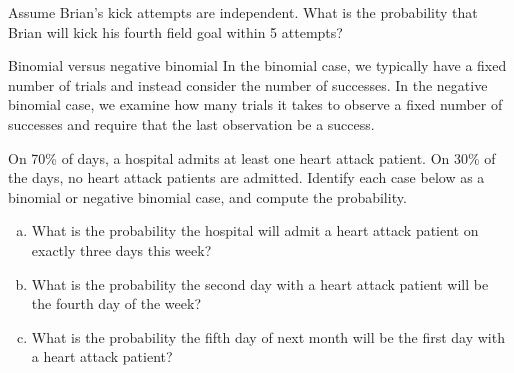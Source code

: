 \begin{exercisewrap}
\begin{nexercise}
Assume Brian's kick attempts are independent. What is the probability that Brian will kick his fourth field goal within 5 attempts?\footnotemark
\end{nexercise}
\end{exercisewrap}

\begin{onebox}{Binomial versus negative binomial}
  In the binomial case, we typically have a fixed number
  of trials and instead consider the number of successes.
  In the negative binomial case, we examine how many trials
  it takes to observe a fixed number of successes and
  require that the last observation be a success.
\end{onebox}

\begin{exercisewrap}
\begin{nexercise}
On 70\% of days, a hospital admits at least one heart attack patient. On 30\% of the days, no heart attack patients are admitted. Identify each case below as a binomial or negative binomial case, and compute the probability.\footnotemark
\begin{enumerate}[(a)]
\item What is the probability the hospital will admit
    a heart attack patient on exactly three days this week?

\item What is the probability the second day with a heart
    attack patient will be the fourth day of the week?

\item What is the probability the fifth day of next month
    will be the first day with a heart attack patient?
\end{enumerate}
\end{nexercise}
\end{exercisewrap}

